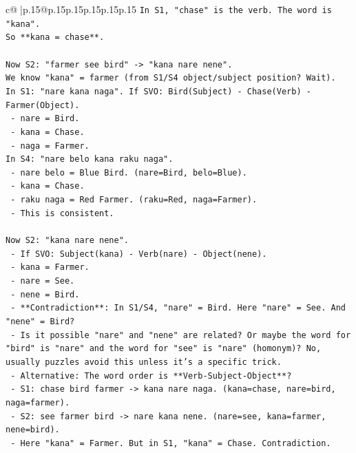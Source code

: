 \documentclass{article}
\begin{document}
{\begin{supertabular}{c@{$\;$}|p{.15\linewidth}@{}p{.15\linewidth}p{.15\linewidth}p{.15\linewidth}p{.15\linewidth}p{.15\linewidth}}
{{{\texttt{In S1, "chase" is the verb. The word is "kana".} \\
\texttt{So **kana = chase**.} \\
\\ 
\texttt{Now S2: "farmer see bird" {-}> "kana nare nene".} \\
\texttt{We know "kana" = farmer (from S1/S4 object/subject position? Wait).} \\
\texttt{In S1: "nare kana naga". If SVO: Bird(Subject) {-} Chase(Verb) {-} Farmer(Object).} \\
\texttt{  {-} nare = Bird.} \\
\texttt{  {-} kana = Chase.} \\
\texttt{  {-} naga = Farmer.} \\
\texttt{In S4: "nare belo kana raku naga".} \\
\texttt{  {-} nare belo = Blue Bird. (nare=Bird, belo=Blue).} \\
\texttt{  {-} kana = Chase.} \\
\texttt{  {-} raku naga = Red Farmer. (raku=Red, naga=Farmer).} \\
\texttt{  {-} This is consistent.} \\
\\ 
\texttt{Now S2: "kana nare nene".} \\
\texttt{  {-} If SVO: Subject(kana) {-} Verb(nare) {-} Object(nene).} \\
\texttt{    {-} kana = Farmer.} \\
\texttt{    {-} nare = See.} \\
\texttt{    {-} nene = Bird.} \\
\texttt{  {-} **Contradiction**: In S1/S4, "nare" = Bird. Here "nare" = See. And "nene" = Bird?} \\
\texttt{  {-} Is it possible "nare" and "nene" are related? Or maybe the word for "bird" is "nare" and the word for "see" is "nare" (homonym)? No, usually puzzles avoid this unless it's a specific trick.} \\
\texttt{  {-} Alternative: The word order is **Verb{-}Subject{-}Object**?} \\
\texttt{    {-} S1: chase bird farmer {-}> kana nare naga. (kana=chase, nare=bird, naga=farmer).} \\
\texttt{    {-} S2: see farmer bird {-}> nare kana nene. (nare=see, kana=farmer, nene=bird).} \\
\texttt{      {-} Here "kana" = Farmer. But in S1, "kana" = Chase. Contradiction.} \\
}}}
\end{supertabular}}
\end{document}
